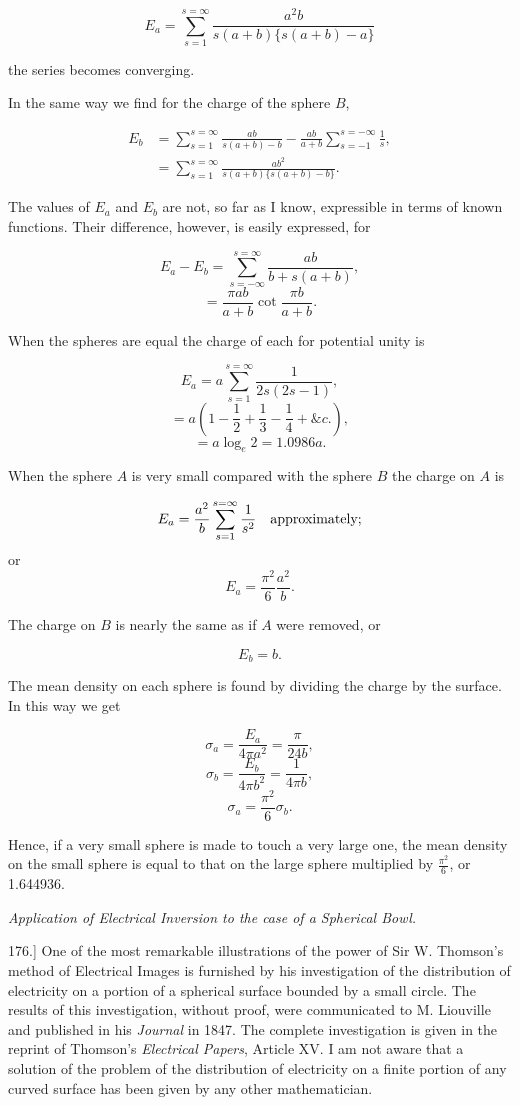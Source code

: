 \documentclass[11pt,a4paper]{article}
\begin{document}
\[
E_a
= \sum_{s=1}^{s=\infty}
  \frac{a^2b}{s(a+b)\{s(a+b)-a\}}
\]

the series becomes converging.

In the same way we find for the charge of the sphere $B$,

\[
\begin{split}
E_b
&= \sum_{s=1}^{s=\infty}\frac{ab}{s(a+b)-b}
   -\frac{ab}{a+b}\sum_{s=-1}^{s=-\infty}\frac{1}{s},\\
&= \sum_{s=1}^{s=\infty}
   \frac{ab^2}{s(a+b)\{s(a+b)-b\}}.
\end{split}
\]

The values of $E_a$ and $E_b$ are not, so far as I know, expressible in terms of known functions. Their difference, however, is easily expressed, for

\[
E_a-E_b
= \sum_{s=-\infty}^{s=\infty}
  \frac{ab}{b+s(a+b)},
\]
\[
= \frac{\pi ab}{a+b}\cot\frac{\pi b}{a+b}.
\]

When the spheres are equal the charge of each for potential unity is

\[
E_a = a \sum_{s=1}^{s=\infty}\frac{1}{2s(2s-1)},
\]
\[
= a\left(1-\frac{1}{2}+\frac{1}{3}-\frac{1}{4}+\&c.\right),
\]
\[
= a\log_e 2 = 1.0986a.
\]

When the sphere $A$ is very small compared with the sphere $B$ the charge on $A$ is

\[
E_a = \frac{a^2}{b}\sum_{s=1}^{s=\infty}\frac{1}{s^2}
\quad \hbox{approximately};
\]
or
\[
E_a = \frac{\pi^2}{6}\frac{a^2}{b}.
\]

The charge on $B$ is nearly the same as if $A$ were removed, or

\[
E_b=b.
\]

The mean density on each sphere is found by dividing the charge by the surface. In this way we get

\[
\sigma_a = \frac{E_a}{4\pi a^2}=\frac{\pi}{24b},
\]
\[
\sigma_b = \frac{E_b}{4\pi b^2}=\frac{1}{4\pi b},
\]
\[
\sigma_a = \frac{\pi^2}{6}\sigma_b.
\]

Hence, if a very small sphere is made to touch a very large one, the mean density on the small sphere is equal to that on the large sphere multiplied by $\frac{\pi^2}{6}$, or 1.644936.

\begin{center}
\textit{Application of Electrical Inversion to the case of a Spherical Bowl.}
\end{center}

176.] One of the most remarkable illustrations of the power of Sir W. Thomson's method of Electrical Images is furnished by his investigation of the distribution of electricity on a portion of a spherical surface bounded by a small circle. The results of this investigation, without proof, were communicated to M. Liouville and published in his \textit{Journal} in 1847. The complete investigation is given in the reprint of Thomson's \textit{Electrical Papers}, Article XV. I am not aware that a solution of the problem of the distribution of electricity on a finite portion of any curved surface has been given by any other mathematician.
\end{document}

